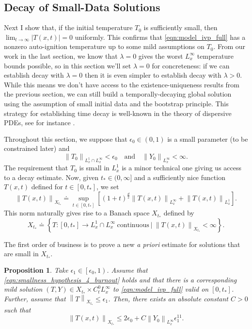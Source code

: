 \documentclass[twosided, 12pt]{article}
\numberwithin{equation}{section}
\theoremstyle{plain}
\newtheorem{prop}[thm]{Proposition}
\newcommand{\eps}{\epsilon}
\begin{document}
\subsection{Decay of Small-Data Solutions}
\noindent Next I show that, if the initial temperature $T_0$ is sufficiently small, then $\lim_{t\rightarrow \infty}|T(x,t)|=0$ uniformly. This confirms that \eqref{eqn:model_ivp_full} has a nonzero auto-ignition temperature up to some mild assumptions on $T_0$. From our work in the last section, we know that $\lambda=0$ gives the worst $L^{\infty}_x$ temperature bounds possible, so in this section we'll set $\lambda=0$ for concreteness: if we can establish decay with $\lambda=0$ then it is even simpler to establish decay with $\lambda>0$. While this means we don't have access to the existence-uniqueness results from the previous section, we can still build a temporally-decaying global solution using the assumption of small initial data and the bootstrap principle. This strategy for establishing time decay is well-known in the theory of dispersive PDEs, see for instance \cite{Morgan2024}. 
\par Throughout this section, we suppose that $\eps_0\in (0,1)$ is a small parameter (to be constrained later) and 
\begin{equation}\label{eqn:smallness_hypothesis_4_burnout}
    \left\|T_0\right\|_{L^1_x\cap L^{\infty}_x} < \eps_0 \quad \text{and} \quad  \left\|Y_0\right\|_{L^{\infty}_x} < \infty. 
\end{equation}
The requirement that $T_0$ is small in $L^1_x$ is a minor technical one giving us access to a decay estimate.  Now, given $t_{*}\in (0,\infty]$ and a sufficiently nice function $T(x,t)$ defined for $t\in [0,t_{*}]$, we set 
\begin{equation*}
    \left\|T(x,t)\right\|_{X_{t_{*}}} \doteq \sup_{t\in [0,t_{*}]}\left[ \left(1+t\right)^{\frac{d}{2}}\left\|T(x,t)\right\|_{L^{\infty}_{x}}+ \left\|T(x,t)\right\|_{L^1_x}\right].
\end{equation*}
This norm naturally gives rise to a Banach space $X_{t_{*}}$ defined by
\begin{equation*}
    X_{t_{*}} \doteq \left\{T\colon [0,t_{*}] \rightarrow L^1_x \cap L^\infty_{x}\  \text{continuous}\ \bigg| \  \left\|T(x,t)\right\|_{X_{t_{*}}}  < \infty\right\}. 
\end{equation*}
\par The first order of business is to prove a new \textit{a priori} estimate for solutions that are small in $X_{t_*}$. 
\begin{prop}\label{prop:bootstrap_close}
    Take $\eps_1 \in \left[\eps_0, 1\right)$. Assume that \eqref{eqn:smallness_hypothesis_4_burnout} holds and that there is a corresponding mild solution $\left(T,Y\right)\in X_{t_{*}}\times C^0_t L^{\infty}_{x}$ to \eqref{eqn:model_ivp_full} valid on $[0,t_{*}]$. Further, assume that $\left\|T\right\|_{X_{t_{*}}} \leq \eps_1$. Then, there exists an absolute constant $C>0$ such that 
    \begin{equation}
        \left\|T(x,t)\right\|_{X_{t_{*}}} \leq 2\eps_0 + C\left\|Y_0\right\|_{L^\infty_x} \eps_1^{11}. 
    \end{equation}
\end{prop}
\end{document}
